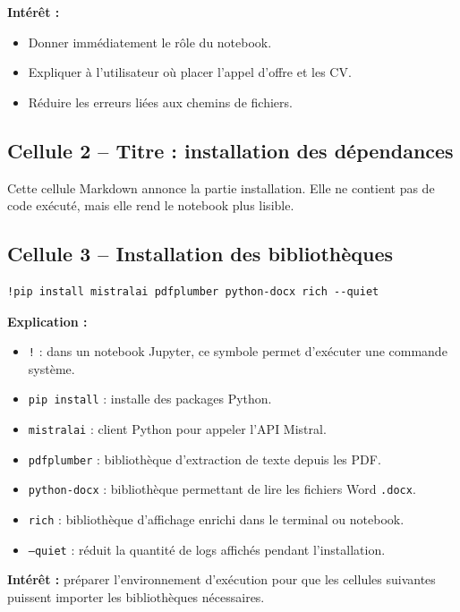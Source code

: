 \documentclass[12pt,a4paper]{article}
\begin{document}
\textbf{Intérêt :}
\begin{itemize}
  \item Donner immédiatement le rôle du notebook.
  \item Expliquer à l'utilisateur où placer l'appel d'offre et les CV.
  \item Réduire les erreurs liées aux chemins de fichiers.
\end{itemize}

\subsection{Cellule 2 -- Titre : installation des dépendances}

Cette cellule Markdown annonce la partie installation. Elle ne contient pas de code exécuté, mais elle rend le notebook plus lisible.

\subsection{Cellule 3 -- Installation des bibliothèques}

\begin{lstlisting}[style=pythonstyle]
!pip install mistralai pdfplumber python-docx rich --quiet
\end{lstlisting}

\textbf{Explication :}
\begin{itemize}
  \item \texttt{!} : dans un notebook Jupyter, ce symbole permet d'exécuter une commande système.
  \item \texttt{pip install} : installe des packages Python.
  \item \texttt{mistralai} : client Python pour appeler l'API Mistral.
  \item \texttt{pdfplumber} : bibliothèque d'extraction de texte depuis les PDF.
  \item \texttt{python-docx} : bibliothèque permettant de lire les fichiers Word \texttt{.docx}.
  \item \texttt{rich} : bibliothèque d'affichage enrichi dans le terminal ou notebook.
  \item \texttt{--quiet} : réduit la quantité de logs affichés pendant l'installation.
\end{itemize}

\textbf{Intérêt :} préparer l'environnement d'exécution pour que les cellules suivantes puissent importer les bibliothèques nécessaires.
\end{document}
